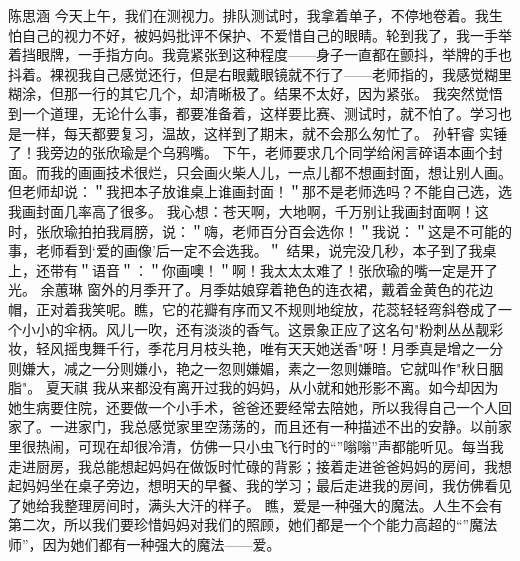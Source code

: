 \markdownRendererInterblockSeparator
{}\markdownRendererInterblockSeparator
{}陈思涵\markdownRendererInterblockSeparator
{}今天上午，我们在测视力。排队测试时，我拿着单子，不停地卷着。我生怕自己的视力不好，被妈妈批评不保护、不爱惜自己的眼睛。轮到我了，我一手举着挡眼牌，一手指方向。我竟紧张到这种程度——身子一直都在颤抖，举牌的手也抖着。裸视我自己感觉还行，但是右眼戴眼镜就不行了——老师指的，我感觉糊里糊涂，但那一行的其它几个，却清晰极了。结果不太好，因为紧张。\markdownRendererInterblockSeparator
{}我突然觉悟到一个道理，无论什么事，都要准备着，这样要比赛、测试时，就不怕了。学习也是一样，每天都要复习，温故，这样到了期末，就不会那么匆忙了。\markdownRendererInterblockSeparator
{}\markdownRendererInterblockSeparator
{}孙轩睿\markdownRendererInterblockSeparator
{}实锤了！我旁边的张欣瑜是个乌鸦嘴。\markdownRendererInterblockSeparator
{}下午，老师要求几个同学给闲言碎语本画个封面。而我的画画技术很烂，只会画火柴人儿，一点儿都不想画封面，想让别人画。但老师却说：＂我把本子放谁桌上谁画封面！＂那不是老师选吗？不能自己选，选我画封面几率高了很多。\markdownRendererInterblockSeparator
{}我心想：苍天啊，大地啊，千万别让我画封面啊！这时，张欣瑜拍拍我肩膀，说：＂嗨，老师百分百会选你！＂我说：＂这是不可能的事，老师看到‘爱的画像’后一定不会选我。＂\markdownRendererInterblockSeparator
{}结果，说完没几秒，本子到了我桌上，还带有＂语音＂：＂你画噢！＂啊！我太太太难了！张欣瑜的嘴一定是开了光。\markdownRendererInterblockSeparator
{}\markdownRendererInterblockSeparator
{}余蕙琳\markdownRendererInterblockSeparator
{}窗外的月季开了。月季姑娘穿着艳色的连衣裙，戴着金黄色的花边帽，正对着我笑呢。瞧，它的花瓣有序而又不规则地绽放，花蕊轻轻弯斜卷成了一个小小的伞柄。风儿一吹，还有淡淡的香气。这景象正应了这名句"粉刺丛丛靓彩妆，轻风摇曳舞千行，季花月月枝头艳，唯有天天她送香"呀！月季真是增之一分则嫌大，减之一分则嫌小，艳之一忽则嫌媚，素之一忽则嫌暗。它就叫作"秋日胭脂"。\markdownRendererInterblockSeparator
{}\markdownRendererInterblockSeparator
{}夏天祺\markdownRendererInterblockSeparator
{}我从来都没有离开过我的妈妈，从小就和她形影不离。如今却因为她生病要住院，还要做一个小手术，爸爸还要经常去陪她，所以我得自己一个人回家了。一进家门，我总感觉家里空荡荡的，而且还有一种描述不出的安静。以前家里很热闹，可现在却很冷清，仿佛一只小虫飞行时的“”嗡嗡”声都能听见。每当我走进厨房，我总能想起妈妈在做饭时忙碌的背影；接着走进爸爸妈妈的房间，我想起妈妈坐在桌子旁边，想明天的早餐、我的学习；最后走进我的房间，我仿佛看见了她给我整理房间时，满头大汗的样子。 瞧，爱是一种强大的魔法。人生不会有第二次，所以我们要珍惜妈妈对我们的照顾，她们都是一个个能力高超的“”魔法师”，因为她们都有一种强大的魔法——爱。\markdownRendererInterblockSeparator
